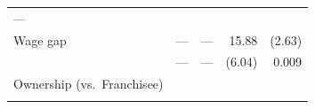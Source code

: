 \documentclass[11pt,a4paper,openany]{book}
\begin{document}
\begin{longtable}[]{@{}lrrrr@{}}
\begin{minipage}[t]{0.06\columnwidth}
---\strut
\end{minipage}\tabularnewline
\begin{minipage}[t]{0.31\columnwidth}\raggedright\strut
Wage gap\strut
\end{minipage} & \begin{minipage}[t]{0.19\columnwidth}\raggedleft\strut
---\strut
\end{minipage} & \begin{minipage}[t]{0.19\columnwidth}\raggedleft\strut
---\strut
\end{minipage} & \begin{minipage}[t]{0.08\columnwidth}\raggedleft\strut
15.88\strut
\end{minipage} & \begin{minipage}[t]{0.06\columnwidth}\raggedleft\strut
(2.63)\strut
\end{minipage}\tabularnewline
\begin{minipage}[t]{0.31\columnwidth}\raggedright\strut
\strut
\end{minipage} & \begin{minipage}[t]{0.19\columnwidth}\raggedleft\strut
---\strut
\end{minipage} & \begin{minipage}[t]{0.19\columnwidth}\raggedleft\strut
---\strut
\end{minipage} & \begin{minipage}[t]{0.08\columnwidth}\raggedleft\strut
(6.04)\strut
\end{minipage} & \begin{minipage}[t]{0.06\columnwidth}\raggedleft\strut
0.009\strut
\end{minipage}\tabularnewline
\begin{minipage}[t]{0.31\columnwidth}\raggedright\strut
Ownership (vs.~Franchisee)\strut
\end{minipage} & \begin{minipage}[t]{0.19\columnwidth}\raggedleft\strut
\strut
\end{minipage} & \begin{minipage}[t]{0.19\columnwidth}\raggedleft\strut
\strut
\end{minipage} & \begin{minipage}[t]{0.08\columnwidth}\raggedleft\strut
\strut
\end{minipage} & \begin{minipage}[t]{0.06\columnwidth}\raggedleft\strut
\strut
\end{minipage}\tabularnewline
\begin{minipage}[t]{0.31\columnwidth}\raggedright\strut

\end{minipage}
\end{longtable}
\end{document}
